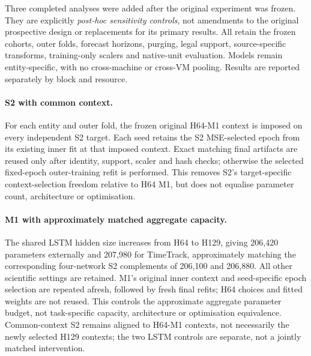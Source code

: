 \documentclass[5p,twocolumn]{elsarticle}
\begin{document}
Three completed analyses were added after the original experiment was
frozen. They are explicitly \emph{post-hoc sensitivity
controls}, not amendments to the original prospective design or replacements
for its primary results. All retain the frozen cohorts, outer folds,
forecast horizons, purging, legal support, source-specific transforms,
training-only scalers and native-unit evaluation. Models remain
entity-specific, with no cross-machine or cross-VM pooling. Results are
reported separately by block and resource.

\paragraph{S2 with common context.}
For each entity and outer fold, the frozen original H64-M1 context is imposed
on every independent S2 target. Each seed retains the S2 MSE-selected epoch
from its existing inner fit at that imposed context. Exact matching final
artifacts are reused only after identity, support, scaler and hash checks;
otherwise the selected fixed-epoch outer-training refit is performed.
This removes S2's target-specific context-selection freedom relative to
H64 M1, but does not equalise parameter count, architecture or optimisation.

\paragraph{M1 with approximately matched aggregate capacity.}
The shared LSTM hidden size increases from H64 to H129, giving 206,420
parameters externally and 207,980 for TimeTrack, approximately matching the
corresponding four-network S2 complements of 206,100 and 206,880. All other
scientific settings are retained. M1's original inner context and
seed-specific epoch selection are repeated afresh, followed by fresh final
refits; H64 choices and fitted weights are not reused. This controls the
approximate aggregate parameter budget, not task-specific capacity,
architecture or optimisation equivalence. Common-context S2 remains aligned
to H64-M1 contexts, not necessarily the newly selected H129 contexts; the
two LSTM controls are separate, not a jointly matched intervention.
\end{document}
